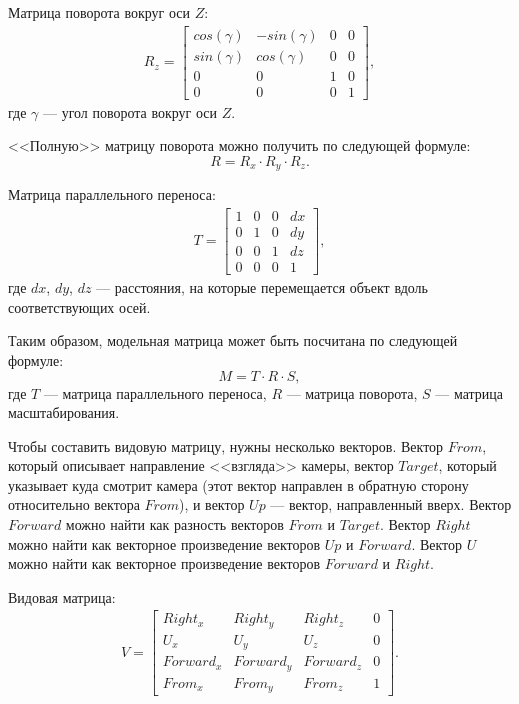 Матрица поворота вокруг оси $Z$:
\begin{equation}
\begin{gathered}
R_z = 
	\begin{bmatrix}
		cos(\gamma) & -sin(\gamma) & 0 & 0 \\
		sin(\gamma) & cos(\gamma) & 0 & 0 \\
		0 & 0 & 1 & 0 \\
		0 & 0 & 0 & 1
	\end{bmatrix},
\end{gathered}
\end{equation}
где $\gamma$  --- угол поворота вокруг оси $Z$.

<<Полную>> матрицу поворота можно получить по следующей формуле:
\begin{equation}
R = R_x \cdot R_y \cdot R_z.
\end{equation}

Матрица параллельного переноса:
\begin{equation}
\begin{gathered}
T = 
	\begin{bmatrix}
		1 & 0 & 0 & dx \\
		0 & 1 & 0 & dy \\
		0 & 0 & 1 & dz \\
		0 & 0 & 0 & 1
	\end{bmatrix},
\end{gathered}
\end{equation}
где $dx$, $dy$, $dz$ --- расстояния, на которые перемещается объект вдоль соответствующих осей.

Таким образом, модельная матрица может быть посчитана по следующей формуле:
\begin{equation}
M = T \cdot R \cdot S,
\end{equation}
где $T$ --- матрица параллельного переноса, $R$ --- матрица поворота, $S$ --- матрица масштабирования.

Чтобы составить видовую матрицу, нужны несколько векторов. 
Вектор $From$, который описывает направление <<взгляда>> камеры, вектор $Target$, который указывает куда смотрит камера (этот вектор направлен в обратную сторону относительно вектора $From$), и вектор $Up$ --- вектор, направленный вверх. 
Вектор $Forward$ можно найти как разность векторов $From$ и $Target$. 
Вектор $Right$ можно найти как векторное произведение векторов $Up$ и $Forward$. 
Вектор $U$ можно найти как векторное произведение векторов $Forward$ и $Right$.

Видовая матрица:
\begin{equation}
\begin{gathered}
V = 
	\begin{bmatrix}
		Right_x & Right_y & Right_z & 0 \\
		U_x & U_y & U_z & 0 \\
		Forward_x & Forward_y & Forward_z & 0 \\
		From_x & From_y & From_z & 1
	\end{bmatrix}.
\end{gathered}
\end{equation}

